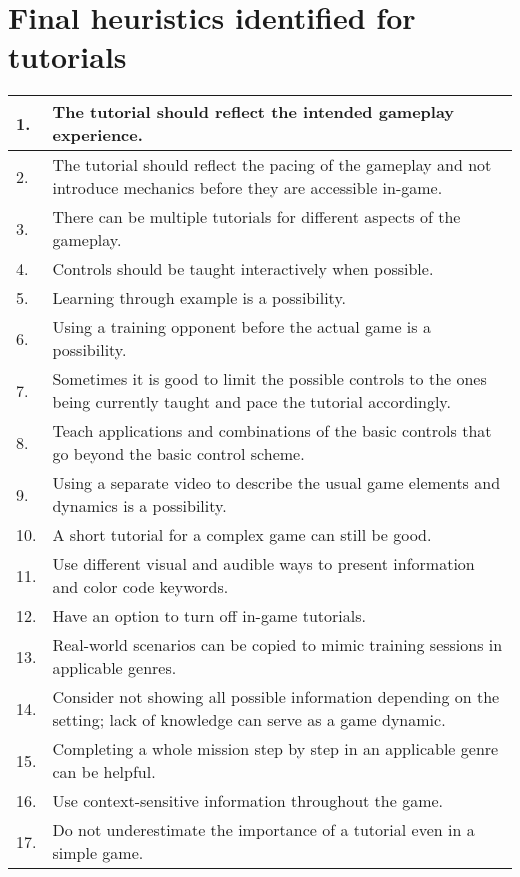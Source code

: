 \appendix
\chapter{Final heuristics identified for tutorials}

\begin{center}
	\begin{tabularx}{\textwidth}{|l|X|}
		\hline
		1. & The tutorial should reflect the intended gameplay experience. \\ \hline
		2. & The tutorial should reflect the pacing of the gameplay and not introduce mechanics before they are accessible in-game. \\ \hline
		3. & There can be multiple tutorials for different aspects of the gameplay. \\ \hline
		4. & Controls should be taught interactively when possible. \\ \hline
		5. & Learning through example is a possibility. \\ \hline
		6. & Using a training opponent before the actual game is a possibility. \\ \hline
		7. & Sometimes it is good to limit the possible controls to the ones being currently taught and pace the tutorial accordingly. \\ \hline
		8. & Teach applications and combinations of the basic controls that go beyond the basic control scheme. \\ \hline
		9. & Using a separate video to describe the usual game elements and dynamics is a possibility. \\ \hline
		10. & A short tutorial for a complex game can still be good. \\ \hline
		11. & Use different visual and audible ways to present information and color code keywords. \\ \hline
		12. & Have an option to turn off in-game tutorials. \\ \hline
		13. & Real-world scenarios can be copied to mimic training sessions in applicable genres. \\ \hline
		14. & Consider not showing all possible information depending on the setting; lack of knowledge can serve as a game dynamic. \\ \hline
		15. & Completing a whole mission step by step in an applicable genre can be helpful. \\ \hline
		16. & Use context-sensitive information throughout the game. \\ \hline
		17. & Do not underestimate the importance of a tutorial even in a simple game. \\ \hline

\end{tabularx}
\end{center}

